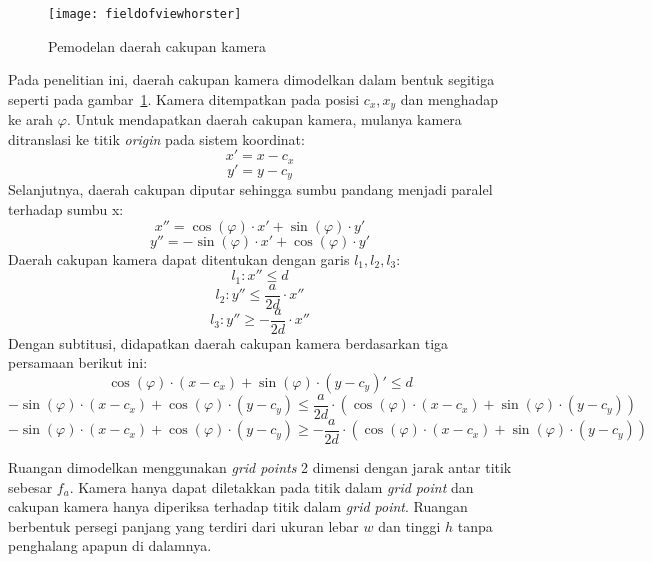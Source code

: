\begin{figure}[H]
	\centering
	\texttt{[image: fieldofviewhorster]}
	\caption[Pemodelan daerah cakupan kamera]{Pemodelan daerah cakupan kamera}
	\label{fig:fieldofviewhorster}
\end{figure}
Pada penelitian ini, daerah cakupan kamera dimodelkan dalam bentuk segitiga seperti pada gambar~\ref{fig:fieldofviewhorster}. Kamera ditempatkan pada posisi \(c_x,x_y\) dan menghadap ke arah \(\varphi\). Untuk mendapatkan daerah cakupan kamera, mulanya kamera ditranslasi ke titik \textit{origin} pada sistem koordinat:
\begin{equation}
	x'=x-c_x
\end{equation}
\begin{equation}
	y'=y-c_y
\end{equation}
Selanjutnya, daerah cakupan diputar sehingga sumbu pandang menjadi paralel terhadap sumbu x:
\begin{equation}
	x''=\cos(\varphi)\cdot x'+\sin(\varphi)\cdot y'
\end{equation}
\begin{equation}
	y''=-\sin(\varphi)\cdot x'+\cos(\varphi)\cdot y'
\end{equation}
Daerah cakupan kamera dapat ditentukan dengan garis \(l_1,l_2,l_3\):
\begin{equation}
	l_1:x''\leq d
\end{equation}
\begin{equation}
	l_2:y''\leq \frac{a}{2d}\cdot x''
\end{equation}
\begin{equation}
	l_3:y''\geq-\frac{a}{2d}\cdot x''
\end{equation}
Dengan subtitusi, didapatkan daerah cakupan kamera berdasarkan tiga persamaan berikut ini:
\begin{equation}
	\cos(\varphi)\cdot(x-c_x)+\sin(\varphi)\cdot(y-c_y)'\leq d
	\label{eq:l1}
\end{equation}
\begin{equation}
	-\sin(\varphi)\cdot(x-c_x)+\cos(\varphi)\cdot(y-c_y)\leq \frac{a}{2d}\cdot (\cos(\varphi)\cdot(x-c_x)+\sin(\varphi)\cdot(y-c_y))	\label{eq:l2}
\end{equation}
\begin{equation}
	-\sin(\varphi)\cdot(x-c_x)+\cos(\varphi)\cdot(y-c_y)\geq- \frac{a}{2d}\cdot (\cos(\varphi)\cdot(x-c_x)+\sin(\varphi)\cdot(y-c_y))
	\label{eq:l3}
\end{equation}

Ruangan dimodelkan menggunakan \textit{grid points} 2 dimensi dengan jarak antar titik sebesar \(f_a\). Kamera hanya dapat diletakkan pada titik dalam \textit{grid point} dan cakupan kamera hanya diperiksa terhadap titik dalam \textit{grid point}. Ruangan berbentuk persegi panjang yang terdiri dari ukuran lebar \(w\) dan tinggi \(h\) tanpa penghalang apapun di dalamnya.

